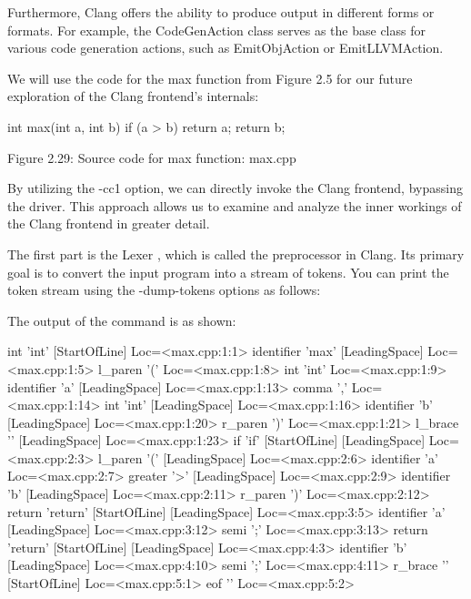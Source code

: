 Furthermore, Clang offers the ability to produce output in different forms or formats. For example, the CodeGenAction class serves as the base class for various code generation actions, such as EmitObjAction or EmitLLVMAction.

We will use the code for the max function from Figure 2.5 for our future exploration of the Clang frontend’s internals:

\begin{cpp}
int max(int a, int b) {
  if (a > b)
    return a;
  return b;
}
\end{cpp}

\begin{center}
Figure 2.29: Source code for max function: max.cpp
\end{center}

By utilizing the -cc1 option, we can directly invoke the Clang frontend, bypassing the driver. This approach allows us to examine and analyze the inner workings of the Clang frontend in greater detail.


The first part is the Lexer , which is called the preprocessor in Clang. Its primary goal is to convert the input program into a stream of tokens. You can print the token stream using the -dump-tokens options as follows:


The output of the command is as shown:

\begin{shell}
int ’int’        [StartOfLine]  Loc=<max.cpp:1:1>
identifier ’max’         [LeadingSpace] Loc=<max.cpp:1:5>
l_paren ’(’             Loc=<max.cpp:1:8>
int ’int’               Loc=<max.cpp:1:9>
identifier ’a’   [LeadingSpace] Loc=<max.cpp:1:13>
comma ’,’               Loc=<max.cpp:1:14>
int ’int’        [LeadingSpace] Loc=<max.cpp:1:16>
identifier ’b’   [LeadingSpace] Loc=<max.cpp:1:20>
r_paren ’)’             Loc=<max.cpp:1:21>
l_brace ’{’      [LeadingSpace] Loc=<max.cpp:1:23>
if ’if’  [StartOfLine] [LeadingSpace]   Loc=<max.cpp:2:3>
l_paren ’(’      [LeadingSpace] Loc=<max.cpp:2:6>
identifier ’a’          Loc=<max.cpp:2:7>
greater ’>’      [LeadingSpace] Loc=<max.cpp:2:9>
identifier ’b’   [LeadingSpace] Loc=<max.cpp:2:11>
r_paren ’)’             Loc=<max.cpp:2:12>
return ’return’  [StartOfLine] [LeadingSpace]   Loc=<max.cpp:3:5>
identifier ’a’   [LeadingSpace] Loc=<max.cpp:3:12>
semi ’;’                Loc=<max.cpp:3:13>
return ’return’  [StartOfLine] [LeadingSpace]   Loc=<max.cpp:4:3>
identifier ’b’   [LeadingSpace] Loc=<max.cpp:4:10>
semi ’;’                Loc=<max.cpp:4:11>
r_brace ’}’      [StartOfLine]  Loc=<max.cpp:5:1>
eof ’’          Loc=<max.cpp:5:2>
\end{shell}

